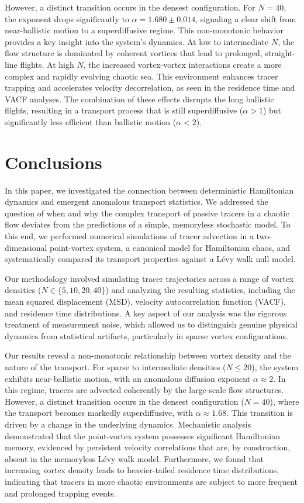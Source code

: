 \documentclass[]{article}
\begin{document}
However, a distinct transition occurs in the densest configuration. For $N=40$, the exponent drops significantly to $\alpha = 1.680 \pm 0.014$, signaling a clear shift from near-ballistic motion to a superdiffusive regime. This non-monotonic behavior provides a key insight into the system's dynamics. At low to intermediate $N$, the flow structure is dominated by coherent vortices that lead to prolonged, straight-line flights. At high $N$, the increased vortex-vortex interactions create a more complex and rapidly evolving chaotic sea. This environment enhances tracer trapping and accelerates velocity decorrelation, as seen in the residence time and VACF analyses. The combination of these effects disrupts the long ballistic flights, resulting in a transport process that is still superdiffusive ($\alpha > 1$) but significantly less efficient than ballistic motion ($\alpha < 2$).

\section{Conclusions}
\label{sec:conclusions}
In this paper, we investigated the connection between deterministic Hamiltonian dynamics and emergent anomalous transport statistics. We addressed the question of when and why the complex transport of passive tracers in a chaotic flow deviates from the predictions of a simple, memoryless stochastic model. To this end, we performed numerical simulations of tracer advection in a two-dimensional point-vortex system, a canonical model for Hamiltonian chaos, and systematically compared its transport properties against a L\'evy walk null model.

Our methodology involved simulating tracer trajectories across a range of vortex densities ($N \in \{5, 10, 20, 40\}$) and analyzing the resulting statistics, including the mean squared displacement (MSD), velocity autocorrelation function (VACF), and residence time distributions. A key aspect of our analysis was the rigorous treatment of measurement noise, which allowed us to distinguish genuine physical dynamics from statistical artifacts, particularly in sparse vortex configurations.

Our results reveal a non-monotonic relationship between vortex density and the nature of the transport. For sparse to intermediate densities ($N \le 20$), the system exhibits near-ballistic motion, with an anomalous diffusion exponent $\alpha \approx 2$. In this regime, tracers are advected coherently by the large-scale flow structures. However, a distinct transition occurs in the densest configuration ($N=40$), where the transport becomes markedly superdiffusive, with $\alpha \approx 1.68$. This transition is driven by a change in the underlying dynamics. Mechanistic analysis demonstrated that the point-vortex system possesses significant Hamiltonian memory, evidenced by persistent velocity correlations that are, by construction, absent in the memoryless L\'evy walk model. Furthermore, we found that increasing vortex density leads to heavier-tailed residence time distributions, indicating that tracers in more chaotic environments are subject to more frequent and prolonged trapping events.
\end{document}

